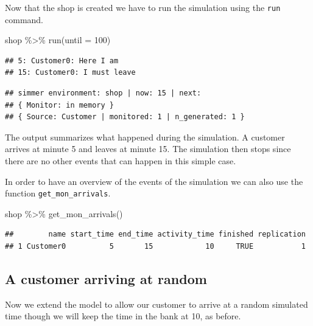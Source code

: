 \documentclass[
]{book}
\newenvironment{Shaded}{\begin{snugshade}}{\end{snugshade}}
\newcommand{\AttributeTok}[1]{\textcolor[rgb]{0.77,0.63,0.00}{#1}}
\newcommand{\DecValTok}[1]{\textcolor[rgb]{0.00,0.00,0.81}{#1}}
\newcommand{\FunctionTok}[1]{\textcolor[rgb]{0.00,0.00,0.00}{#1}}
\newcommand{\NormalTok}[1]{#1}
\newcommand{\SpecialCharTok}[1]{\textcolor[rgb]{0.00,0.00,0.00}{#1}}
\begin{document}
Now that the shop is created we have to run the simulation using the \texttt{run} command.

\begin{Shaded}
\begin{Highlighting}[]
\NormalTok{shop }\SpecialCharTok{\%\textgreater{}\%} \FunctionTok{run}\NormalTok{(}\AttributeTok{until =} \DecValTok{100}\NormalTok{)}
\end{Highlighting}
\end{Shaded}

\begin{verbatim}
## 5: Customer0: Here I am
## 15: Customer0: I must leave
\end{verbatim}

\begin{verbatim}
## simmer environment: shop | now: 15 | next: 
## { Monitor: in memory }
## { Source: Customer | monitored: 1 | n_generated: 1 }
\end{verbatim}

The output summarizes what happened during the simulation. A customer arrives at minute 5 and leaves at minute 15. The simulation then stops since there are no other events that can happen in this simple case.

In order to have an overview of the events of the simulation we can also use the function \texttt{get\_mon\_arrivals}.

\begin{Shaded}
\begin{Highlighting}[]
\NormalTok{shop }\SpecialCharTok{\%\textgreater{}\%} \FunctionTok{get\_mon\_arrivals}\NormalTok{()}
\end{Highlighting}
\end{Shaded}

\begin{verbatim}
##        name start_time end_time activity_time finished replication
## 1 Customer0          5       15            10     TRUE           1
\end{verbatim}

\hypertarget{a-customer-arriving-at-random}{%
\subsection{A customer arriving at random}\label{a-customer-arriving-at-random}}

Now we extend the model to allow our customer to arrive at a random simulated time though we will keep the time in the bank at 10, as before.
\end{document}
